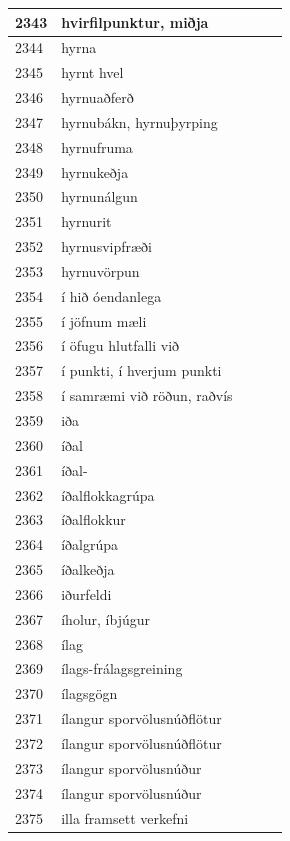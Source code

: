 \begin{longtable}{p{}|p{}|p{}|p{}|p{}}
\hline
2343 & hvirfilpunktur, miðja &  &  &  \\
\hline
2344 & hyrna &  &  &  \\
\hline
2345 & hyrnt hvel &  &  &  \\
\hline
2346 & hyrnuaðferð &  &  &  \\
\hline
2347 & hyrnubákn, hyrnuþyrping &  &  &  \\
\hline
2348 & hyrnufruma &  &  &  \\
\hline
2349 & hyrnukeðja &  &  &  \\
\hline
2350 & hyrnunálgun &  &  &  \\
\hline
2351 & hyrnurit &  &  &  \\
\hline
2352 & hyrnusvipfræði &  &  &  \\
\hline
2353 & hyrnuvörpun &  &  &  \\
\hline
2354 & í hið óendanlega &  &  &  \\
\hline
2355 & í jöfnum mæli &  &  &  \\
\hline
2356 & í öfugu hlutfalli við &  &  &  \\
\hline
2357 & í punkti, í hverjum punkti &  &  &  \\
\hline
2358 & í samræmi við röðun, raðvís &  &  &  \\
\hline
2359 & iða &  &  &  \\
\hline
2360 & íðal &  &  &  \\
\hline
2361 & íðal- &  &  &  \\
\hline
2362 & íðalflokkagrúpa &  &  &  \\
\hline
2363 & íðalflokkur &  &  &  \\
\hline
2364 & íðalgrúpa &  &  &  \\
\hline
2365 & íðalkeðja &  &  &  \\
\hline
2366 & iðurfeldi &  &  &  \\
\hline
2367 & íholur, íbjúgur &  &  &  \\
\hline
2368 & ílag &  &  &  \\
\hline
2369 & ílags-frálagsgreining &  &  &  \\
\hline
2370 & ílagsgögn &  &  &  \\
\hline
2371 & ílangur sporvölusnúðflötur &  &  &  \\
\hline
2372 & ílangur sporvölusnúðflötur &  &  &  \\
\hline
2373 & ílangur sporvölusnúður &  &  &  \\
\hline
2374 & ílangur sporvölusnúður &  &  &  \\
\hline
2375 & illa framsett verkefni &  &  &  \\

\end{longtable}
